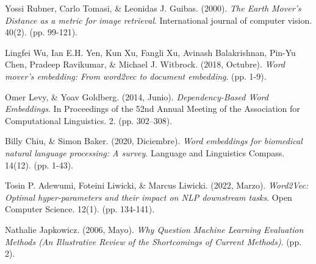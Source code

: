 \documentclass[12pt,a4paper]{article}
\begin{document}
\begin{sloppypar}
\begin{thebibliography}{9}
Yossi Rubner, Carlo Tomasi, \& Leonidas J. Guibas. (2000). \textit{The Earth Mover’s Distance as a metric for image retrieval}. International journal of computer vision. 40(2). (pp. 99-121).

Lingfei Wu, Ian E.H. Yen, Kun Xu, Fangli Xu, Avinash Balakrishnan, Pin-Yu Chen, Pradeep Ravikumar, \& Michael J. Witbrock. (2018, Octubre). \textit{Word mover’s embedding: From word2vec to document embedding}. (pp. 1-9).

Omer Levy, \& Yoav Goldberg. (2014, Junio). \textit{Dependency-Based Word Embeddings}. In Proceedings of the 52nd Annual Meeting of the Association for Computational Linguistics. 2. (pp. 302–308).

Billy Chiu, \& Simon Baker. (2020, Diciembre). \textit{Word embeddings for biomedical natural language processing: A survey}. Language and Linguistics Compass. 14(12). (pp. 1-43).

Tosin P. Adewumi, Foteini Liwicki, \& Marcus Liwicki. (2022, Marzo). \textit{Word2Vec: Optimal hyper-parameters and their impact on NLP downstream tasks}. Open Computer Science. 12(1). (pp. 134-141).

Nathalie Japkowicz. (2006, Mayo). \textit{Why Question Machine Learning Evaluation Methods (An Illustrative Review of the Shortcomings of Current Methods)}. (pp. 2).

\end{thebibliography}

\end{sloppypar}
\end{document}
